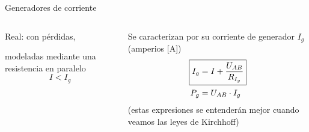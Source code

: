 \documentclass[aspectratio=169, xcolor={usenames,svgnames,dvipsnames}]{beamer}
\begin{document}
\begin{frame}{Generadores de corriente}
\begin{columns}[T]
\begin{column}{0.38\columnwidth}
\begin{center}
        \vspace{2mm}
        \alert{Real}: con pérdidas, 
        
        modeladas mediante una resistencia \alert{en paralelo}
        \vspace{-2mm}
        \begin{equation*}
            I<I_g
        \end{equation*}
        \end{center}
    \end{column}
    \begin{column}{0.21\columnwidth}

        \vspace{10mm}Se caracterizan por su \alert{corriente de generador} $I_g$ (amperios [A])        
        \begin{align*}
            \Aboxed{I_g&=I+\dfrac{U_{AB}}{R_{I_g}}}\\
            P_g&=U_{AB}\cdot I_g
        \end{align*}
        \footnotesize{(estas expresiones se entenderán mejor cuando veamos las leyes de Kirchhoff)}
    \end{column}
    \end{columns}
\end{frame}

\end{document}
